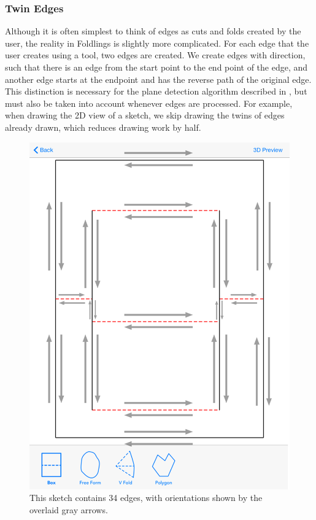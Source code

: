 \subsubsection{Twin Edges}\label{twin-edges}

Although it is often simplest to think of edges as cuts and folds
created by the user, the reality in Foldlings is slightly more
complicated. For each edge that the user creates using a tool, two edges
are created. We create edges with direction, such that there is an edge
from the start point to the end point of the edge, and another edge
starts at the endpoint and has the reverse path of the original edge.
This distinction is necessary for the plane detection algorithm
described in \citet{mallen}, but must also be taken into account
whenever edges are processed. For example, when drawing the 2D view of a
sketch, we skip drawing the twins of edges already drawn, which reduces
drawing work by half.

\begin{figure}[htbp]
\centering
\includegraphics{figures/33_UI_Interface_Data_Structures/boxfold_34_edges.png}
\caption{This sketch contains 34 edges, with orientations shown by the
overlaid gray arrows.}
\end{figure}

